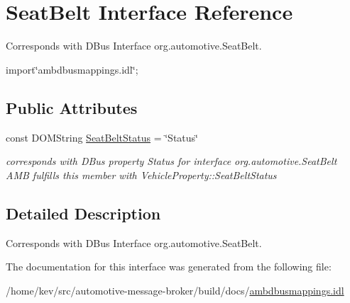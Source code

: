 \hypertarget{interfaceSeatBelt}{\section{Seat\+Belt Interface Reference}
\label{interfaceSeatBelt}
}


Corresponds with D\+Bus Interface org.\+automotive.\+Seat\+Belt.  




{\ttfamily import\char`\"{}ambdbusmappings.\+idl\char`\"{};}

\subsection*{Public Attributes}
\begin{DoxyCompactItemize}
\item 
\hypertarget{interfaceSeatBelt_af060a6f2b6f0447a59dfb3505ecf4682}{const D\+O\+M\+String \hyperlink{interfaceSeatBelt_af060a6f2b6f0447a59dfb3505ecf4682}{Seat\+Belt\+Status} = \char`\"{}Status\char`\"{}}\label{interfaceSeatBelt_af060a6f2b6f0447a59dfb3505ecf4682}

\begin{DoxyCompactList}\small\item\em corresponds with D\+Bus property Status for interface org.\+automotive.\+Seat\+Belt A\+M\+B fulfills this member with Vehicle\+Property\+::\+Seat\+Belt\+Status \end{DoxyCompactList}\end{DoxyCompactItemize}


\subsection{Detailed Description}
Corresponds with D\+Bus Interface org.\+automotive.\+Seat\+Belt. 

The documentation for this interface was generated from the following file\+:\begin{DoxyCompactItemize}
\item 
/home/kev/src/automotive-\/message-\/broker/build/docs/\hyperlink{ambdbusmappings_8idl}{ambdbusmappings.\+idl}\end{DoxyCompactItemize}
